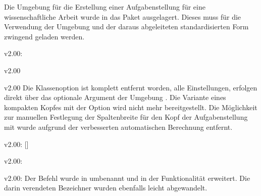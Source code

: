 \minisec{\taskname}
\begin{Bundle}{}
Die Umgebung für die Erstellung einer Aufgabenstellung für eine 
wissenschaftliche Arbeit wurde in das Paket  
ausgelagert. Dieses muss für die Verwendung der Umgebung  
und der daraus abgeleiteten standardisierten Form zwingend geladen werden.

\begin{Obsolete}{v2.00:}{}
\begin{Obsolete}{v2.00}{}
\begin{Obsolete}{v2.00}{}
\printobsoletelist%
%
Die Klassenoption  ist komplett entfernt worden, alle 
Einstellungen, erfolgen direkt über das optionale Argument der Umgebung 
. Die Variante eines kompakten Kopfes mit der Option 
 wird nicht mehr bereitgestellt. Die Möglichkeit zur 
manuellen Festlegung der Spaltenbreite für den Kopf der Aufgabenstellung mit 
 wurde aufgrund der verbesserten automatischen Berechnung 
entfernt.
\end{Obsolete}
\end{Obsolete}
\end{Obsolete}

\begin{Obsolete}{v2.00:}{%
  []%
}
\begin{Obsolete}{v2.00:}{}
\begin{Obsolete}{v2.00:}{}
\printobsoletelist%
%
Der Befehl  wurde in  umbenannt und in der 
Funktionalität erweitert. Die darin verendeten Bezeichner wurden ebenfalls 
leicht abgewandelt.
\end{Obsolete}
\end{Obsolete}
\end{Obsolete}


\end{Bundle}
